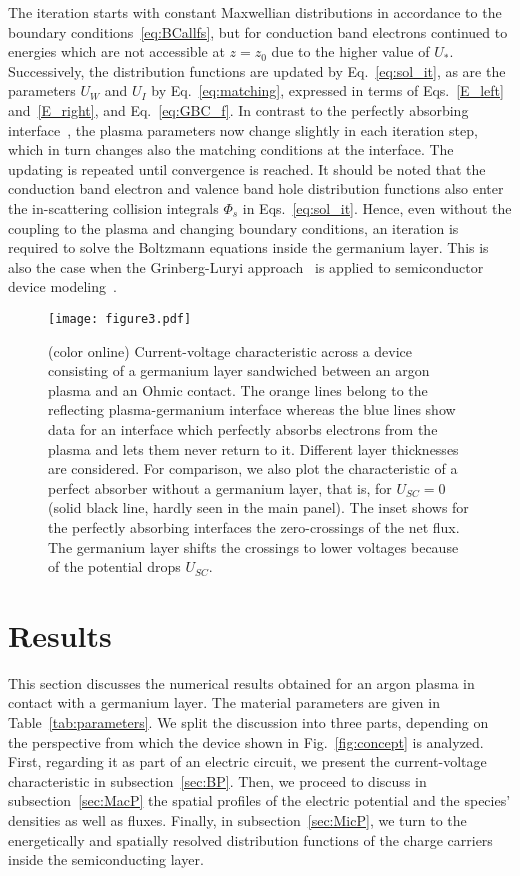 \documentclass[pre,reprint,floats]{revtex4-1}
\begin{document}
The iteration starts with constant Maxwellian distributions in accordance to the boundary 
conditions~\eqref{eq:BCallfs}, but for conduction band electrons continued to energies which are not 
accessible at $z=z_0$ due to the higher value of $U_*$. Successively, the distribution functions 
are updated by Eq.~\eqref{eq:sol_it}, as are the parameters $U_W$ and $U_I$ by Eq.~\eqref{eq:matching},
expressed in terms of Eqs.~\eqref{E_left} and~\eqref{E_right}, and Eq.~\eqref{eq:GBC_f}. In contrast 
to the perfectly absorbing interface~\cite{RBF20}, the plasma parameters 
now change slightly in each iteration step, which in turn changes also the matching conditions at 
the interface. The updating is repeated until convergence is reached. It should be noted that 
the conduction band electron and valence band hole distribution functions also enter
the in-scattering collision integrals $\Phi_s$ in Eqs.~\eqref{eq:sol_it}. Hence, even without 
the coupling to the plasma and changing boundary conditions, an iteration is required to solve
the Boltzmann equations inside the germanium layer. This is also the case when the 
Grinberg-Luryi approach~\cite{GL92} is applied to semiconductor device modeling~\cite{DP98,KH02}. 

\begin{figure}[t]
\texttt{[image: figure3.pdf]}
\caption{(color online) Current-voltage characteristic across a device consisting of a germanium
layer sandwiched between an argon plasma and an Ohmic contact. The orange lines belong to the reflecting
plasma-germanium interface whereas the blue lines show data for an interface which perfectly absorbs 
electrons from the plasma and lets them never return to it. Different layer thicknesses are considered. For 
comparison, we also plot the characteristic of a perfect absorber without a germanium layer, that is, 
for $U_{SC}=0$ (solid black line, hardly seen in the main panel). The inset shows for the perfectly 
absorbing interfaces the zero-crossings of the net flux. The germanium layer shifts the crossings to 
lower voltages because of the potential drops $U_{SC}$.}
\label{fig:UI}
\end{figure}

\section{Results}\label{sec:results}

This section discusses the numerical results obtained for an argon plasma in contact with a germanium
layer. The material parameters are given in Table~\ref{tab:parameters}. We split the discussion into 
three parts, depending on the perspective from which the device shown in Fig.~\ref{fig:concept} is 
analyzed. First, regarding it as part of an electric circuit, we present the current-voltage 
characteristic in subsection~\ref{sec:BP}. Then, we proceed to discuss in subsection~\ref{sec:MacP}
the spatial profiles of the electric potential and the species' densities as well as fluxes. 
Finally, in subsection~\ref{sec:MicP}, we turn to the energetically and spatially resolved 
distribution functions of the charge carriers inside the semiconducting layer.
	
\end{document}

